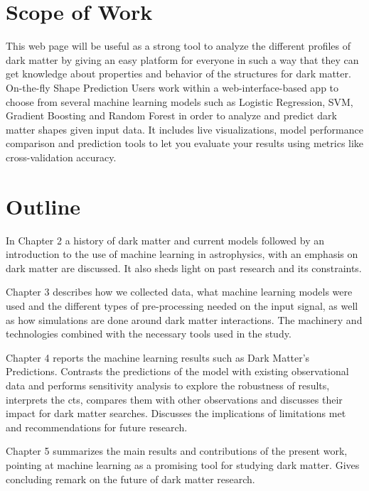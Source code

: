 \section{Scope of Work}
This web page will be useful as a strong tool to analyze the different profiles of dark matter by giving an easy platform for everyone in such a way that they can get knowledge about properties and behavior of the structures for dark matter. On-the-fly Shape Prediction Users work within a web-interface-based app to choose from several machine learning models such as Logistic Regression, SVM, Gradient Boosting and Random Forest in order to analyze and predict dark matter shapes given input data. It includes live visualizations, model performance comparison and prediction tools to let you evaluate your results using metrics like cross-validation accuracy.

 


 

\section{Outline}

In Chapter 2 a history of dark matter and current models followed by an introduction to the use of machine learning in astrophysics, with an emphasis on dark matter are discussed. It also sheds light on past research and its constraints.

Chapter 3 describes how we collected data, what machine learning models were used and the different types of pre-processing needed on the input signal, as well as how simulations are done around dark matter interactions. The machinery and technologies combined with the necessary tools used in the study.

Chapter 4 reports the machine learning results such as Dark Matter's Predictions. Contrasts the predictions of the model with existing observational data and performs sensitivity analysis to explore the robustness of results, interprets the cts, compares them with other observations and discusses their impact for dark matter searches. Discusses the implications of limitations met and recommendations for future research.

Chapter 5 summarizes the main results and contributions of the present work, pointing at machine learning as a promising tool for studying dark matter. Gives concluding remark on the future of dark matter research.

 

 
  





